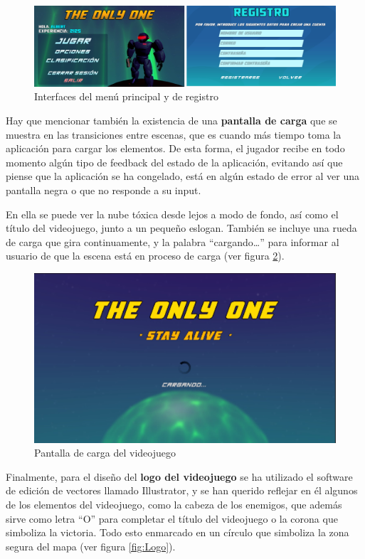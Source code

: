 \begin{figure}[h]
    \centering
    \includegraphics[scale=0.45]{img/Interfaces.jpg}
    \caption{Interfaces del menú principal y de registro}
    \label{fig:InterfacesManuRegistro}
    \end{figure}
    
Hay que mencionar también la existencia de una \textbf{pantalla de carga} que se muestra en las transiciones entre escenas, que es cuando más tiempo toma la aplicación para cargar los elementos. De esta forma, el jugador recibe en todo momento algún tipo de feedback del estado de la aplicación, evitando así que piense que la aplicación se ha congelado, está en algún estado de error al ver una pantalla negra o que no responde a su input.

En ella se puede ver la nube tóxica desde lejos a modo de fondo, así como el título del videojuego, junto a un pequeño eslogan. También se incluye una rueda de carga que gira continuamente, y la palabra ``cargando…'' para informar al usuario de que la escena está en proceso de carga (ver figura \ref{fig:PantallaDeCarga}).

\begin{figure}[h]
    \centering
    \includegraphics[scale=0.45]{img/LoadingScreen.jpg}
    \caption{Pantalla de carga del videojuego}
    \label{fig:PantallaDeCarga}
    \end{figure}
    
Finalmente, para el diseño del \textbf{logo del videojuego} se ha utilizado el software de edición de vectores llamado Illustrator, y se han querido reflejar en él algunos de los elementos del videojuego, como la cabeza de los enemigos, que además sirve como letra “O” para completar el título del videojuego o la corona que simboliza la victoria. Todo esto enmarcado en un círculo que simboliza la zona segura del mapa (ver figura \ref{fig:Logo}).

